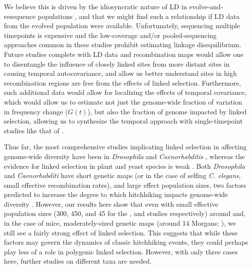 \documentclass[11pt]{article}
\newcommand{\graham}[1]{\todo[size=\scriptsize, color=red!50]{#1}}
\begin{document}

We believe this is driven by the idiosyncratic nature of LD in
evolve-and-resequence populations \parencite{Nuzhdin2013-gf,Kelly2019-dc}, and
that we might find such a relationship if LD data from the evolved population
were available. Unfortunately, sequencing multiple timepoints is expensive and
the low-coverage and/or pooled-sequencing approaches common in these studies
prohibit estimating linkage disequilibrium. Future studies complete with LD
data and recombination maps would allow one to disentangle the influence of
closely linked sites from more distant sites in causing temporal
autocovariance, and allow us better understand sites in high recombination
regions are free from the effects of linked selection. Furthermore, such
additional data would allow for localizing the effects of temporal covariance,
which would allow us to estimate not just the genome-wide fraction of variation
in frequency change ($G(t)$), but also the fraction of genome impacted by
linked selection, allowing us to synthesize the temporal approach with
single-timepoint studies like that of \textcite{Elyashiv2016-vt}.


Thus far, the most comprehensive studies implicating linked selection in
affecting genome-wide diversity have been in \emph{Drosophila}
\parencite{Begun1992-ey,Elyashiv2016-vt,Sattath2011-dr} and
\emph{Caenorhabditis} \parencite{Cutter2003-tl,Cutter2003-tl,Andersen2012-bj},
whereas the evidence for linked selection in plant and yeast species is weak
\parencite{Cutter2013-ba}. Both \emph{Drosophila} and \emph{Caenorhabditi} have
short genetic maps (or in the case of selfing \emph{C.  elegans}, small
effective recombination rates), and large effect population sizes, two factors
predicted to increase the degree to which hitchhiking impacts genome-wide
diversity \parencite{Barton2000-zg}. However, our results here show that even
with small effective population sizes (300, 450, and 45 for the
\textcite{Kelly2019-dc}, and \textcite{Castro2019-uk} studies respectively)
around and, in the case of mice, moderately-sized genetic maps (around 14
Morgans; \cite{Cox2009-hf}), we still see a fairly strong effect of linked
selection. This suggests that while these factors may govern the dynamics of
classic hitchhiking events, they could perhaps play less of a role in polygenic
linked selection. However, with only three cases here, further studies on
different taxa are needed.
\end{document}
